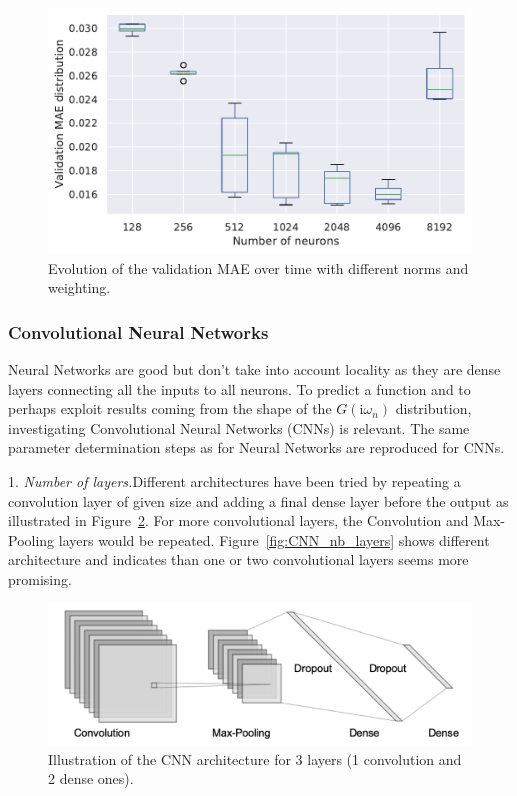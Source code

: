 \documentclass[reprint,amsmath,amssymb,aps,pra]{revtex4-2}
\newcommand{\iwn}{\mathrm{i}\omega_n}
\begin{document}
\begin{figure}[H]
\includegraphics[width=\columnwidth]{analytical_continuation/NN_nb_neurons.pdf}
\caption{\label{fig:NN_nb_nueurons}Evolution of the validation MAE over time with different norms and weighting.}
\end{figure}

\subsubsection{Convolutional Neural Networks}
Neural Networks are good but don't take into account locality as they are dense layers connecting all the inputs to all neurons. To predict a function and to perhaps exploit results coming from the shape of the $G(\iwn)$ distribution, investigating Convolutional Neural Networks (CNNs) is relevant. The same parameter determination steps as for Neural Networks are reproduced for CNNs.

1. \emph{Number of layers.}\quad Different architectures have been tried by repeating a convolution layer of given size and adding a final dense layer before the output as illustrated in Figure~\ref{fig:CNN_archi}. For more convolutional layers, the Convolution and Max-Pooling layers would be repeated. Figure~\ref{fig:CNN_nb_layers} shows different architecture and indicates than one or two convolutional layers seems more promising.

\begin{figure}[H]
\includegraphics[width=\columnwidth]{analytical_continuation/CNN_architecture.png}
\caption{\label{fig:CNN_archi}Illustration of the CNN architecture for 3 layers (1 convolution and 2 dense ones). }
\end{figure}
\end{document}
